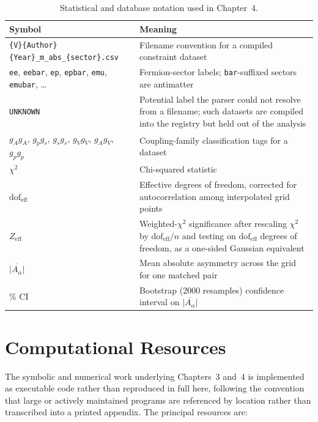 \begin{table}[h]
\centering
\begin{tabular}{@{}>{\raggedright\arraybackslash}p{3.6cm}>{\raggedright\arraybackslash}p{8.5cm}@{}}
\toprule
Symbol & Meaning \\
\midrule
\texttt{\{V\}\{Author\}\{Year\}}\allowbreak\texttt{\_m\_abs\_}\allowbreak\texttt{\{sector\}.csv} & Filename convention for a compiled constraint dataset \\
\texttt{ee}, \texttt{eebar}, \texttt{ep}, \texttt{epbar}, \texttt{emu}, \texttt{emubar}, \ldots & Fermion-sector labels; \texttt{bar}-suffixed sectors are antimatter \\
\texttt{UNKNOWN} & Potential label the parser could not resolve from a filename; such datasets are compiled into the registry but held out of the analysis \\
$g_Ag_A$, $g_pg_s$, $g_sg_s$, $g_Vg_V$, $g_Ag_V$, $g_pg_p$ & Coupling-family classification tags for a dataset \\
$\chi^2$ & Chi-squared statistic \\
$\mathrm{dof}_{\text{eff}}$ & Effective degrees of freedom, corrected for autocorrelation among interpolated grid points \\
$Z_{\text{eff}}$ & Weighted-$\chi^2$ significance after rescaling $\chi^2$ by $\mathrm{dof}_{\text{eff}}/n$ and testing on $\mathrm{dof}_{\text{eff}}$ degrees of freedom, as a one-sided Gaussian equivalent \\
$\overline{|A_\alpha|}$ & Mean absolute asymmetry across the grid for one matched pair \\
95\% CI & Bootstrap (2000 resamples) confidence interval on $\overline{|A_\alpha|}$ \\
\bottomrule
\end{tabular}
\caption{Statistical and database notation used in Chapter~4.}
\label{tab:app-stats}
\end{table}

\chapter{Computational Resources}
\label{app:code}

The symbolic and numerical work underlying Chapters~3 and~4 is implemented
as executable code rather than reproduced in full here, following the
convention that large or actively maintained programs are referenced by
location rather than transcribed into a printed appendix. The principal
resources are:

